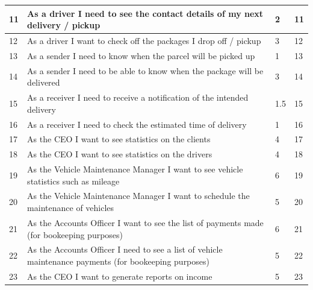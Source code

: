 \documentclass[paper=a4, fontsize=11pt]{scrartcl} %
\numberwithin{equation}{section} %
\numberwithin{figure}{section} %
\numberwithin{table}{section} %
\begin{document}
\begin{table}[!hbt]
\begin{tabular}{|p{1cm}|p{8cm}|p{2cm}|p{1.2cm}|}
11          & As a driver I need to see the contact details of my next delivery / pickup                             & 2                 & 11                \\ \hline
12          & As a driver I want to check off the packages I drop off / pickup                                       & 3                 & 12                \\ \hline
13          & As a sender I need to know when the parcel will be picked up                                           & 1                 & 13                \\ \hline
14          & As a sender I need to be able to know when the package will be delivered                               & 3                 & 14                \\ \hline
15          & As a receiver I need to receive a notification of the intended delivery                                & 1.5               & 15                \\ \hline
16          & As a receiver I need to check the estimated time of delivery                                           & 1                 & 16                \\ \hline
17          & As the CEO I want to see statistics on the clients                                                     & 4                 & 17                \\ \hline
18          & As the CEO I want to see statistics on the drivers                                                     & 4                 & 18                \\ \hline
19          & As the Vehicle Maintenance Manager I want to see vehicle statistics such as mileage                    & 6                 & 19                \\ \hline
20          & As the Vehicle Maintenance Manager I want to schedule the maintenance of vehicles                      & 5                 & 20                \\ \hline
21          & As the Accounts Officer I want to see the list of payments made (for bookeeping purposes)              & 6                 & 21                \\ \hline
22          & As the Accounts Officer I need to see a list of vehicle maintenance payments (for bookeeping purposes) & 5                 & 22                \\ \hline
23          & As the CEO I want to generate reports on income                                                        & 5                 & 23                \\ \hline

\end{tabular}
\end{table}
\end{document}
